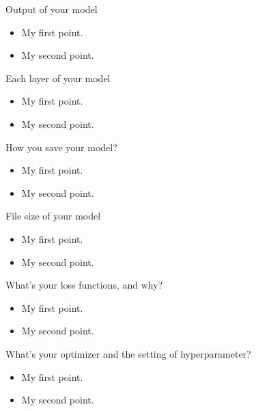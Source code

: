 \documentclass{beamer}
\begin{document}
\begin{frame}{Output of your model }
  \begin{itemize}
  \item {
    My first point.
  }
  \item {
    My second point.
  }
  \end{itemize}
\end{frame}

\begin{frame}{Each layer of your model}
  \begin{itemize}
  \item {
    My first point.
  }
  \item {
    My second point.
  }
  \end{itemize}
\end{frame}

\begin{frame}{How you save your model?}
  \begin{itemize}
  \item {
    My first point.
  }
  \item {
    My second point.
  }
  \end{itemize}
\end{frame}

\begin{frame}{File size of your model }
  \begin{itemize}
  \item {
    My first point.
  }
  \item {
    My second point.
  }
  \end{itemize}
\end{frame}

\begin{frame}{What's your loss functions, and why? }
  \begin{itemize}
  \item {
    My first point.
  }
  \item {
    My second point.
  }
  \end{itemize}
\end{frame}

\begin{frame}{What's your optimizer and the setting of hyperparameter?}
  \begin{itemize}
  \item {
    My first point.
  }
  \item {
    My second point.
  }
  \end{itemize}
\end{frame}
\end{document}
